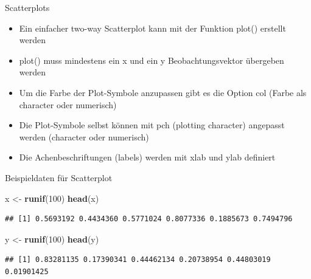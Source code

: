 \documentclass[ignorenonframetext,]{beamer}
\newenvironment{Shaded}{}{}
\newcommand{\KeywordTok}[1]{\textcolor[rgb]{0.00,0.44,0.13}{\textbf{{#1}}}}
\newcommand{\DecValTok}[1]{\textcolor[rgb]{0.25,0.63,0.44}{{#1}}}
\newcommand{\StringTok}[1]{\textcolor[rgb]{0.25,0.44,0.63}{{#1}}}
\newcommand{\NormalTok}[1]{{#1}}
\providecommand{\tightlist}{%
\setlength{\itemsep}{0pt}\setlength{\parskip}{0pt}}
\begin{document}
\begin{frame}{Scatterplots}

\begin{itemize}
\tightlist
\item
  Ein einfacher two-way Scatterplot kann mit der Funktion plot()
  erstellt werden
\item
  plot() muss mindestens ein x und ein y Beobachtungsvektor übergeben
  werden
\item
  Um die Farbe der Plot-Symbole anzupassen gibt es die Option col (Farbe
  als character oder numerisch)
\item
  Die Plot-Symbole selbst können mit pch (plotting character) angepasst
  werden (character oder numerisch)
\item
  Die Achenbeschriftungen (labels) werden mit xlab und ylab definiert
\end{itemize}

\end{frame}

\begin{frame}[fragile]{Beispieldaten für Scatterplot}

\begin{Shaded}
\begin{Highlighting}[]
\NormalTok{x <-}\StringTok{ }\KeywordTok{runif}\NormalTok{(}\DecValTok{100}\NormalTok{)}
\KeywordTok{head}\NormalTok{(x)}
\end{Highlighting}
\end{Shaded}

\begin{verbatim}
## [1] 0.5693192 0.4434360 0.5771024 0.8077336 0.1885673 0.7494796
\end{verbatim}

\begin{Shaded}
\begin{Highlighting}[]
\NormalTok{y <-}\StringTok{ }\KeywordTok{runif}\NormalTok{(}\DecValTok{100}\NormalTok{)}
\KeywordTok{head}\NormalTok{(y)}
\end{Highlighting}
\end{Shaded}

\begin{verbatim}
## [1] 0.83281135 0.17390341 0.44462134 0.20738954 0.44803019 0.01901425
\end{verbatim}

\end{frame}
\end{document}

